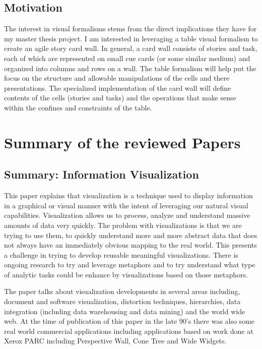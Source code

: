 \documentclass{sig-alternate}
\begin{document}
\subsection{Motivation}
The interest in visual formalisms stems from the direct implications they have
for my master thesis project. I am interested in leveraging a table visual
formalism to create an agile story card wall. In general, a card wall consists
of stories and task, each of which are represented on small cue cards (or some
similar medium) and organized into columns and rows on a wall. The table
formalism will help put the focus on the structure and allowable manipulations
of the cells and there presentations. The specialized implementation of the card
wall will define contents of the cells (stories and tasks) and the operations
that make sense within the confines and constraints of the table.

\section{Summary of the reviewed Papers}
\subsection{Summary: Information Visualization\cite{Gershon:1998:Informationvisualization}}
This paper explains that visualization is a technique used to display
information in a graphical or visual manner with the intent of leveraging our
natural visual capabilities. Visualization allows us to process, analyze and
understand massive amounts of data very quickly. The problem with
visualizations is that we are trying to use them, to quickly understand more and
more abstract data that does not always have an immediately obvious mapping to
the real world. This presents a challenge in trying to develop reusable
meaningful visualizations. There is ongoing research to try and leverage
metaphors and to try understand what type of analytic tasks could be enhance by
visualizations based on those metaphors.

The paper talks about visualization developments in several areas including,
document and software visualization, distortion techniques, hierarchies, data
integration (including data warehousing and data mining) and the world wide web.
At the time of publication of this paper in the late 90's there was also some
real world commercial applications including applications based on work done at
Xerox PARC including Perspective Wall, Cone Tree and Wide Widgets.
\end{document}
